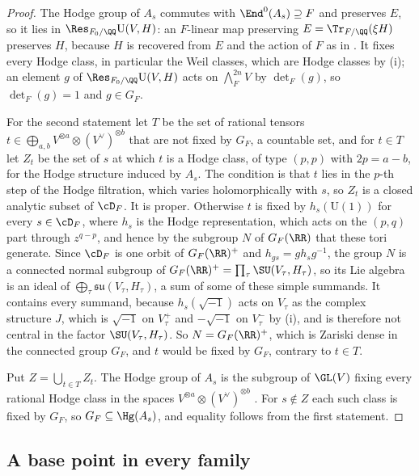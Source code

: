 \begin{proof}
The Hodge group of $A_{s}$ commutes with $\End^{0}(A_{s})\supseteq F$ and
preserves $E$, so it lies in $\Res_{F_{0}/\QQ}\mathrm{U}(V,H)$: an $F$-linear
map preserving $E=\Tr_{F/\QQ}(\xi H)$ preserves $H$, because $H$ is recovered
from $E$ and the action of $F$ as in . It fixes every Hodge
class, in particular the Weil classes, which are Hodge classes by
(i); an element $g$ of $\Res_{F_{0}/\QQ}\mathrm{U}(V,H)$ acts
on $\bigwedge^{2n}_{F}V$ by $\det_{F}(g)$, so $\det_{F}(g)=1$ and
$g\in G_{F}$.

For the second statement let $T$ be the set of rational tensors
$t\in\bigoplus_{a,b}V^{\otimes a}\otimes(V^{\vee})^{\otimes b}$ that are not
fixed by $G_{F}$, a countable set, and for $t\in T$ let $Z_{t}$ be the set of
$s$ at which $t$ is a Hodge class, of type $(p,p)$ with $2p=a-b$, for the
Hodge structure induced by $A_{s}$. The condition is that $t$ lies in the
$p$-th step of the Hodge filtration, which varies holomorphically with $s$, so
$Z_{t}$ is a closed analytic subset of $\cD_{F}$. It is proper. Otherwise $t$
is fixed by $h_{s}(\mathrm{U}(1))$ for every $s\in\cD_{F}$, where $h_{s}$ is
the Hodge representation, which acts on the $(p,q)$ part through
$z^{q-p}$, and hence by the
subgroup $N$ of $G_{F}(\RR)$ that these tori generate. Since $\cD_{F}$ is one
orbit of $G_{F}(\RR)^{+}$ and $h_{gs}=gh_{s}g^{-1}$, the group $N$ is a
connected normal subgroup of $G_{F}(\RR)^{+}=\prod_{\tau}\SU(V_{\tau},H_{\tau})$,
so its Lie algebra is an ideal of
$\bigoplus_{\tau}\mathfrak{su}(V_{\tau},H_{\tau})$, a sum of some of these
simple summands. It contains every summand, because $h_{s}(\sqrt{-1})$ acts on
$V_{\tau}$ as the complex structure $J$, which is $\sqrt{-1}$ on
$V^{+}_{\tau}$ and $-\sqrt{-1}$ on $V^{-}_{\tau}$ by (i),
and is therefore not central in the factor $\SU(V_{\tau},H_{\tau})$. So
$N=G_{F}(\RR)^{+}$, which is Zariski dense in the connected group $G_{F}$,
and $t$ would be fixed by $G_{F}$, contrary to $t\in T$.

Put $Z=\bigcup_{t\in T}Z_{t}$. The Hodge group of $A_{s}$ is the subgroup of
$\GL(V)$ fixing every rational Hodge class in the spaces
$V^{\otimes a}\otimes(V^{\vee})^{\otimes b}$ \cite[\S3]{Del82}.
For $s\notin Z$ each such class is fixed by $G_{F}$, so
$G_{F}\subseteq\Hg(A_{s})$, and equality follows from the first statement.
\end{proof}

\subsection{A base point in every family}

